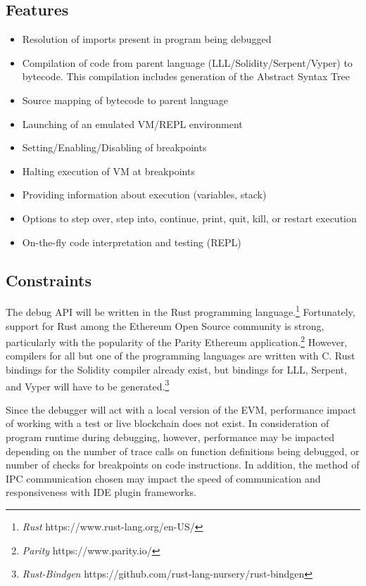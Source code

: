 \documentclass[]{article}
\begin{document}
\subsection{Features}
\begin{itemize}
\item Resolution of imports present in program being debugged
\item Compilation of code from parent language (LLL/Solidity/Serpent/Vyper) to bytecode. This compilation includes generation of the Abstract Syntax Tree
\item Source mapping of bytecode to parent language
\item Launching of an emulated VM/REPL environment
\item Setting/Enabling/Disabling of breakpoints
\item Halting execution of VM at breakpoints
\item Providing information about execution (variables, stack)
\item Options to step over, step into, continue, print, quit, kill, or restart execution
\item On-the-fly code interpretation and testing (REPL)
\end{itemize}

\subsection{Constraints}
The debug API will be written in the Rust programming language.\footnote{\textit{Rust} https://www.rust-lang.org/en-US/} Fortunately, support for Rust among the Ethereum Open Source community is strong, particularly with the popularity of the Parity Ethereum application.\footnote{\textit{Parity} https://www.parity.io/} However, compilers for all but one of the programming languages are written with C. Rust bindings for the Solidity compiler already exist, but bindings for LLL, Serpent, and Vyper will have to be generated.\footnote{\textit{Rust-Bindgen} https://github.com/rust-lang-nursery/rust-bindgen}

Since the debugger will act with a local version of the EVM, performance impact of working with a test or live blockchain does not exist. In consideration of program runtime during debugging, however, performance may be impacted depending on the number of trace calls on function definitions being debugged, or number of checks for breakpoints on code instructions. In addition, the method of IPC communication chosen may impact the speed of communication and responsiveness with IDE plugin frameworks.
\end{document}
